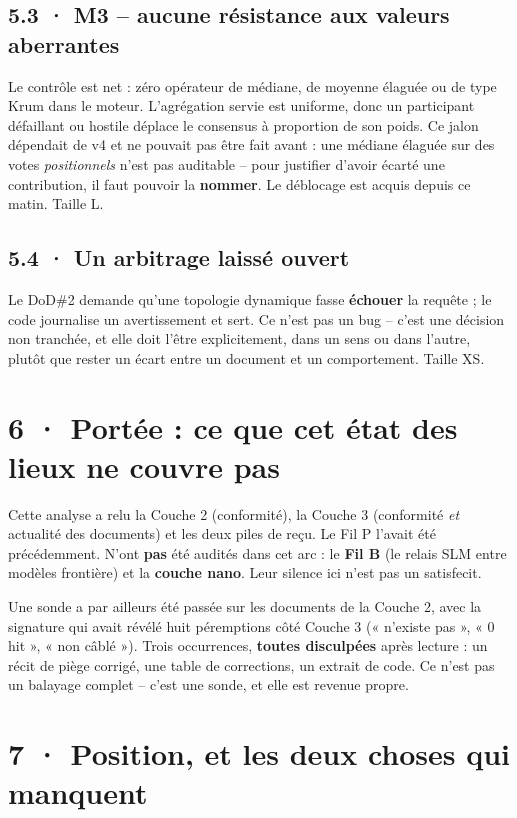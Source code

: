 \documentclass[10pt]{article}
\newcommand{\sz}[1]{{\small\color{grey}\textsf{#1}}}
\begin{document}
\subsection{5.3 · M3 -- aucune résistance aux valeurs aberrantes}

Le contrôle est net : zéro opérateur de médiane, de moyenne élaguée ou de type Krum dans le moteur.
L'agrégation servie est uniforme, donc un participant défaillant ou hostile déplace le consensus à
proportion de son poids. Ce jalon dépendait de v4 et ne pouvait pas être fait avant : une médiane
élaguée sur des votes \emph{positionnels} n'est pas auditable -- pour justifier d'avoir écarté une
contribution, il faut pouvoir la \textbf{nommer}. Le déblocage est acquis depuis ce matin. \sz{Taille L.}

\subsection{5.4 · Un arbitrage laissé ouvert}

Le DoD\#2 demande qu'une topologie dynamique fasse \textbf{échouer} la requête ; le code journalise un
avertissement et sert. Ce n'est pas un bug -- c'est une décision non tranchée, et elle doit l'être
explicitement, dans un sens ou dans l'autre, plutôt que rester un écart entre un document et un
comportement. \sz{Taille XS.}

\section{6 · Portée : ce que cet état des lieux ne couvre pas}

Cette analyse a relu la Couche 2 (conformité), la Couche 3 (conformité \emph{et} actualité des
documents) et les deux piles de reçu. Le Fil P l'avait été précédemment. N'ont \textbf{pas} été
audités dans cet arc : le \textbf{Fil B} (le relais SLM entre modèles frontière) et la \textbf{couche
nano}. Leur silence ici n'est pas un satisfecit.

Une sonde a par ailleurs été passée sur les documents de la Couche 2, avec la signature qui avait
révélé huit péremptions côté Couche 3 (« n'existe pas », « 0 hit », « non câblé »). Trois occurrences,
\textbf{toutes disculpées} après lecture : un récit de piège corrigé, une table de corrections, un
extrait de code. Ce n'est pas un balayage complet -- c'est une sonde, et elle est revenue propre.

\section{7 · Position, et les deux choses qui manquent}
\end{document}
